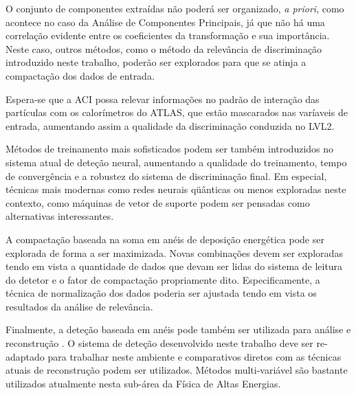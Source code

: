 O conjunto de componentes extraídas não poderá ser organizado, \textit{a
priori}, como acontece no caso da Análise de Componentes Principais, já que
não há uma correlação evidente entre os coeficientes da transformação e sua
importância. Neste caso, outros métodos, como o método da relevância de
discriminação introduzido neste trabalho, poderão ser explorados para que se
atinja a compactação dos dados de entrada.

Espera-se que a ACI possa relevar informações no padrão de interação das
partículas com os calorímetros do ATLAS, que estão mascarados nas varíaveis de
entrada, aumentando assim a qualidade da discriminação conduzida no LVL2.

Métodos de treinamento mais sofisticados podem ser também introduzidos no
sistema atual de deteção neural, aumentando a qualidade do treinamento, tempo
de convergência e a robustez do sistema de discriminação final. Em especial,
técnicas mais modernas como redes neurais qüânticas \cite{qnns} ou menos
exploradas neste contexto, como máquinas de vetor de suporte \cite{haykin}
podem ser pensadas como alternativas interessantes.

A compactação baseada na soma em anéis de deposição energética pode ser
explorada de forma a ser maximizada. Novas combinações devem ser exploradas
tendo em vista a quantidade de dados que devam ser lidas do sistema de
leitura do detetor e o fator de compactação propriamente dito. Especificamente,
a técnica de normalização dos dados poderia ser ajustada tendo em vista os
resultados da análise de relevância.

Finalmente, a deteção baseada em anéis pode também ser utilizada para análise
e reconstrução . O sistema de deteção desenvolvido neste trabalho
deve ser re-adaptado para trabalhar neste ambiente e comparativos diretos com
as técnicas atuais de reconstrução podem ser utilizados. Métodos
multi-variável são bastante utilizados atualmente nesta sub-área da Física de
Altas Energias.


